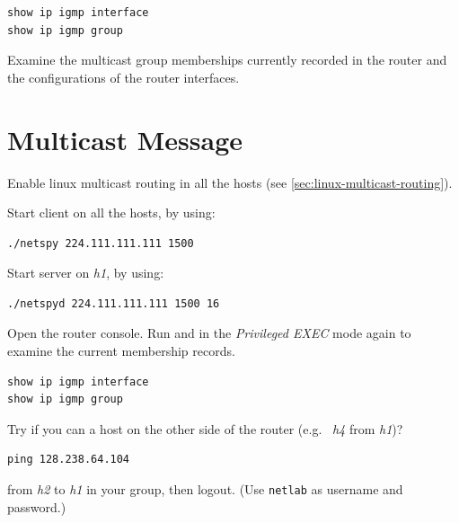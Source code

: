 \documentclass{../UTNetLab}
\begin{document}
\begin{lstlisting}[language=cisco]
show ip igmp interface
show ip igmp group
\end{lstlisting}

\begin{report}
    \item Examine the multicast group memberships currently recorded in the router and the configurations of the router interfaces.
\end{report}

\section{Multicast Message}
Enable linux multicast routing in all the hosts (see \autoref{sec:linux-multicast-routing}).

Start  client on all the hosts, by using:
\begin{lstlisting}
./netspy 224.111.111.111 1500
\end{lstlisting}

Start  server on \textit{h1}, by using:
\begin{lstlisting}
./netspyd 224.111.111.111 1500 16
\end{lstlisting}

Open the router console.
Run  and  in the \textit{Privileged EXEC} mode again to examine the current membership records.

\begin{lstlisting}[language=cisco]
show ip igmp interface
show ip igmp group
\end{lstlisting}

Try if you can  a host on the other side of the router (e.g.\  \textit{h4} from \textit{h1})?

\begin{lstlisting}
ping 128.238.64.104
\end{lstlisting}

 from \textit{h2} to \textit{h1} in your group, then logout. (Use \texttt{netlab} as username and password.)
\end{document}
